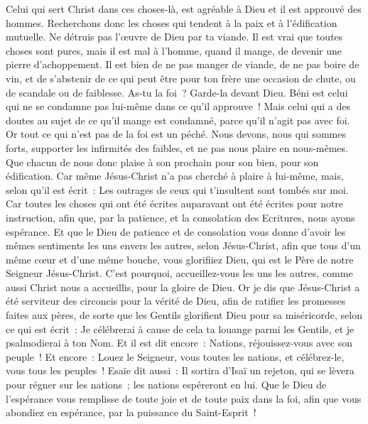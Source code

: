 \begin{multicols}{2}
Celui qui sert Christ dans ces choses-là, est agréable à Dieu et il est approuvé des hommes.
Recherchons donc les choses qui tendent à la paix et à l'édification mutuelle.
Ne détruis pas l'œuvre de Dieu par ta viande. Il est vrai que toutes choses sont pures, mais il est mal à l'homme, quand il mange, de devenir une pierre d'achoppement.
Il est bien de ne pas manger de viande, de ne pas boire de vin, et de s'abstenir de ce qui peut être pour ton frère une occasion de chute, ou de scandale ou de faiblesse.
As-tu la foi~? Garde-la devant Dieu. Béni est celui qui ne se condamne pas lui-même dans ce qu'il approuve~!
Mais celui qui a des doutes au sujet de ce qu'il mange est condamné, parce qu'il n'agit pas avec foi. Or tout ce qui n'est pas de la foi est un péché.
\VerseOne{}Nous devons, nous qui sommes forts, supporter les infirmités des faibles, et ne pas nous plaire en nous-mêmes.
Que chacun de nous donc plaise à son prochain pour son bien, pour son édification.
Car même Jésus-Christ n'a pas cherché à plaire à lui-même, mais, selon qu'il est écrit~: Les outrages de ceux qui t'insultent sont tombés sur moi.
Car toutes les choses qui ont été écrites auparavant ont été écrites pour notre instruction, afin que, par la patience, et la consolation des Ecritures, nous ayons espérance.
Et que le Dieu de patience et de consolation vous donne d'avoir les mêmes sentiments les uns envers les autres, selon Jésus-Christ,
afin que tous d'un même cœur et d'une même bouche, vous glorifiiez Dieu, qui est le Père de notre Seigneur Jésus-Christ.
C'est pourquoi, accueillez-vous les uns les autres, comme aussi Christ nous a accueillis, pour la gloire de Dieu.
Or je dis que Jésus-Christ a été serviteur des circoncis pour la vérité de Dieu, afin de ratifier les promesses faites aux pères,
de sorte que les Gentils glorifient Dieu pour sa miséricorde, selon ce qui est écrit~: Je célébrerai à cause de cela ta louange parmi les Gentils, et je psalmodierai à ton Nom. Et il est dit encore~:
Nations, réjouissez-vous avec son peuple~!
Et encore~: Louez le Seigneur, vous toutes les nations, et célébrez-le, vous tous les peuples~! Esaïe dit aussi~:
Il sortira d'Isaï un rejeton, qui se lèvera pour régner sur les nations~; les nations espéreront en lui.
Que le Dieu de l'espérance vous remplisse de toute joie et de toute paix dans la foi, afin que vous abondiez en espérance, par la puissance du Saint-Esprit~!

\end{multicols}
